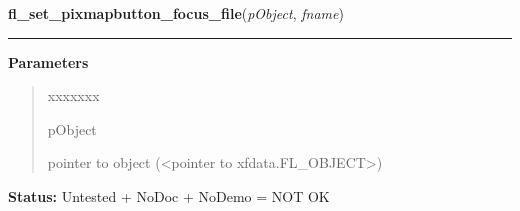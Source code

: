     \label{xformslib:library:fl_set_pixmapbutton_focus_file}

    \vspace{0.5ex}

\hspace{.8\funcindent}\begin{boxedminipage}{\funcwidth}

    \raggedright \textbf{fl\_set\_pixmapbutton\_focus\_file}(\textit{pObject}, \textit{fname})

    \vspace{-1.5ex}

    \rule{\textwidth}{0.5\fboxrule}
\setlength{\parskip}{2ex}
\setlength{\parskip}{1ex}
      \textbf{Parameters}
      \vspace{-1ex}

      \begin{quote}
        \begin{Ventry}{xxxxxxx}

          \item[pObject]

          pointer to object ({\textless}pointer to 
          xfdata.FL\_OBJECT{\textgreater})

        \end{Ventry}

      \end{quote}

\textbf{Status:} Untested + NoDoc + NoDemo = NOT OK



    \end{boxedminipage}

    \label{xformslib:library:fl_set_pixmapbutton_focus_pixmap}

    \vspace{0.5ex}

